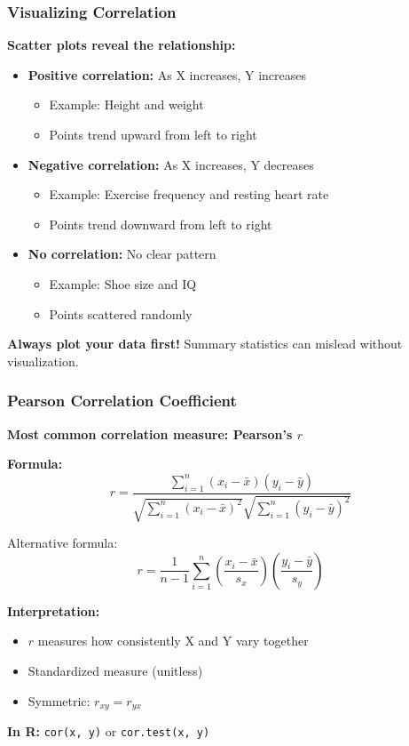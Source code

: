 \documentclass{beamer}
\begin{document}
\begin{frame}
\frametitle{Visualizing Correlation}
\textbf{Scatter plots reveal the relationship:}

\vspace{0.3cm}
\begin{itemize}
\item \textbf{Positive correlation:} As X increases, Y increases
  \begin{itemize}
  \item Example: Height and weight
  \item Points trend upward from left to right
  \end{itemize}

\vspace{0.3cm}
\item \textbf{Negative correlation:} As X increases, Y decreases
  \begin{itemize}
  \item Example: Exercise frequency and resting heart rate
  \item Points trend downward from left to right
  \end{itemize}

\vspace{0.3cm}
\item \textbf{No correlation:} No clear pattern
  \begin{itemize}
  \item Example: Shoe size and IQ
  \item Points scattered randomly
  \end{itemize}
\end{itemize}

\vspace{0.3cm}
\textbf{Always plot your data first!} Summary statistics can mislead without visualization.
\end{frame}

\begin{frame}
\frametitle{Pearson Correlation Coefficient}
\textbf{Most common correlation measure: Pearson's $r$}

\vspace{0.3cm}
\textbf{Formula:}
$$r = \frac{\sum_{i=1}^{n}(x_i - \bar{x})(y_i - \bar{y})}{\sqrt{\sum_{i=1}^{n}(x_i - \bar{x})^2} \sqrt{\sum_{i=1}^{n}(y_i - \bar{y})^2}}$$

Alternative formula:
$$r = \frac{1}{n-1} \sum_{i=1}^{n} \left(\frac{x_i - \bar{x}}{s_x}\right) \left(\frac{y_i - \bar{y}}{s_y}\right)$$

\vspace{0.3cm}
\textbf{Interpretation:}
\begin{itemize}
\item $r$ measures how consistently X and Y vary together
\item Standardized measure (unitless)
\item Symmetric: $r_{xy} = r_{yx}$
\end{itemize}

\vspace{0.3cm}
\textbf{In R:} \texttt{cor(x, y)} or \texttt{cor.test(x, y)}
\end{frame}
\end{document}
